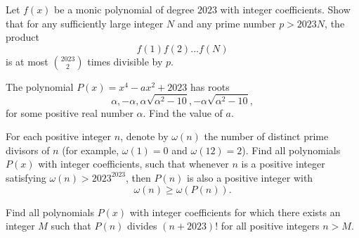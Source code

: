 %	




\begin{question}[name={2023 German TST 4, \href{https://artofproblemsolving.com/community/c6h3111820p28148783}{Problem 3}}]
	Let $f(x)$ be a monic polynomial of degree $2023$ with integer coefficients.
	Show that for any sufficiently large integer $N$ and any prime number $p>2023N$, the product
	\[f(1)f(2)\dots f(N)\]is at most $\binom{2023}{2}$ times divisible by $p$.
\end{question}


%	



\begin{question}[name={2023 Purple Comet, \href{https://artofproblemsolving.com/community/c6h3082466p27849705}{Problem 16}}]
	The polynomial $P(x)=x^4-ax^2+2023$ has roots $$\alpha  ,-\alpha  ,\alpha\sqrt{\alpha^2-10}  ,-\alpha\sqrt{\alpha^2-10},$$ for some positive real number $\alpha$. Find the value of $a$.
\end{question}


%	


\begin{question}[name={2023 British Math Olympiad, \href{https://artofproblemsolving.com/community/c6h3069481p27703501}{Problem 3}}]
	For each positive integer $n$, denote by $\omega(n)$ the number of distinct prime divisors of $n$ (for example, $\omega(1)=0$ and $\omega(12)=2$). Find all polynomials $P(x)$ with integer coefficients, such that whenever $n$ is a positive integer satisfying $\omega(n)>2023^{2023}$, then $P(n)$ is also a positive integer with
	\[\omega(n)\ge\omega(P(n)).\]
\end{question}



%	



\begin{question}[name={2023 Thailand Mock IMO, \href{https://artofproblemsolving.com/community/c6h3082444p27849614}{Problem 4}}]
	Find all polynomials $P(x)$ with integer coefficients for which there exists an integer $M$ such that $P(n)$ divides $(n+2023)!$ for all positive integers $n>M$.
\end{question}




